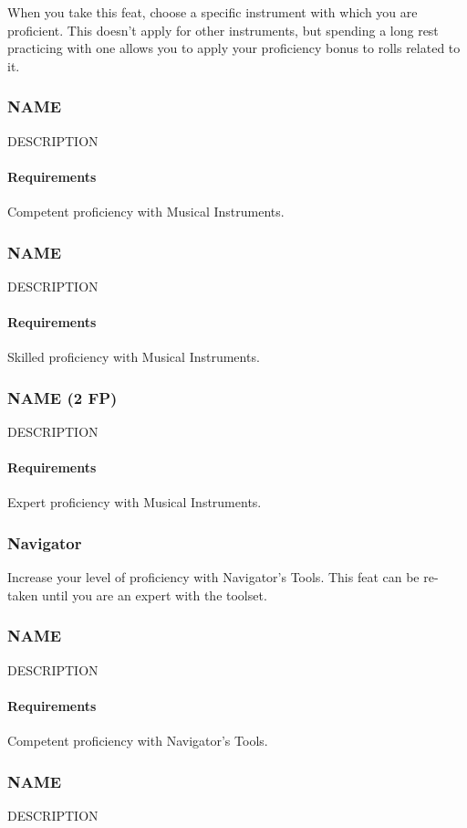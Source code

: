     When you take this feat, choose a specific instrument with which you are proficient.
    This doesn't apply for other instruments, but spending a long rest practicing with one allows you to apply your proficiency bonus to rolls related to it.
\subsubsection{NAME} \label{feat::name}
    DESCRIPTION
    \paragraph{Requirements} Competent proficiency with Musical Instruments.
\subsubsection{NAME} \label{feat::name}
    DESCRIPTION
    \paragraph{Requirements} Skilled proficiency with Musical Instruments.
\subsubsection{NAME (2 FP)} \label{feat::name}
    DESCRIPTION
    \paragraph{Requirements} Expert proficiency with Musical Instruments.
\subsubsection{Navigator} \label{feat::navigator}
    Increase your level of proficiency with Navigator's Tools.
    This feat can be re-taken until you are an expert with the toolset.
\subsubsection{NAME} \label{feat::name}
    DESCRIPTION
    \paragraph{Requirements} Competent proficiency with Navigator's Tools.
\subsubsection{NAME} \label{feat::name}
    DESCRIPTION
